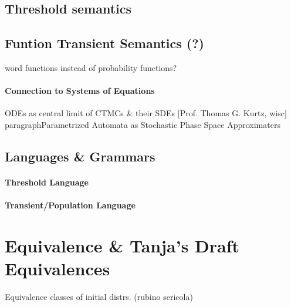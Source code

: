             \begin{definition}
            \end{definition}
                       
        
        \subsection{Threshold semantics}
            
        
        \subsection{Funtion Transient Semantics (?)}
        word functions instead of probability functions?
           
        
        
        \paragraph{Connection to Systems of Equations}
         ODEs as central limit of CTMCs & their SDEs
        [Prof. Thomas G. Kurtz, wisc]
        paragraph{Parametrized Automata as Stochastic Phase Space Approximaters}
        
    \subsection{Languages \& Grammars}
        \paragraph{Threshold Language}
        
        \paragraph{Transient/Population Language}
        
        
    \section{Equivalence \& Tanja's Draft Equivalences}
            \begin{definition}
            
        \end{definition}
        
        Equivalence classes of initial distrs. (rubino sericola)
        
